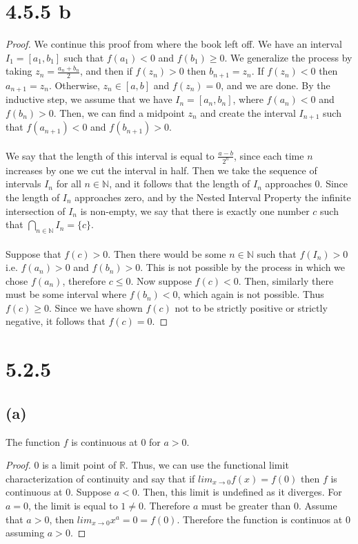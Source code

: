 \documentclass{article}
\begin{document}
\section*{4.5.5 b}
\begin{proof}
We continue this proof from where the book left off. We have an interval $I_1 = [a_1, b_1]$ such that $f(a_1) < 0$ and $f(b_1) \geqslant 0$. We generalize the process by taking $z_n = \frac{a_n + b_n}{2}$, and then if $f(z_n) > 0$ then $b_{n+1} = z_n$. If $f(z_n) < 0$ then $a_{n+1} = z_n$. Otherwise, $z_n \in [a,b]$ and $f(z_n) = 0$, and we are done. By the inductive step, we assume that we have $I_n = [a_n, b_n]$, where $f(a_n) < 0$ and $f(b_n) > 0$. Then, we can find a midpoint $z_n$ and create the interval $I_{n+1}$ such that $f(a_{n+1}) < 0$ and $f(b_{n+1}) > 0$. \\\\
We say that the length of this interval is equal to $\frac{a-b}{2^n}$, since each time $n$ increases by one we cut the interval in half. Then we take the sequence of intervals $I_n$ for all $n \in \mathbb{N}$, and it follows that the length of $I_n$ approaches 0. Since the length of $I_n$ approaches zero, and by the Nested Interval Property the infinite intersection of $I_n$ is non-empty, we say that there is exactly one number $c$ such that $\bigcap_{n \in \mathbb{N}}I_n = \{c\}$. \\\\
Suppose that $f(c) > 0$. Then there would be some $n \in \mathbb{N}$ such that $f(I_n) > 0$ i.e. $f(a_n) > 0$ and $f(b_n) > 0$. This is not possible by the process in which we chose $f(a_n)$, therefore $c \leqslant 0$. Now suppose $f(c) < 0$. Then, similarly there must be some interval where $f(b_n) < 0$, which again is not possible. Thus $f(c )\geqslant 0$. Since we have shown $f(c)$ not to be strictly positive or strictly negative, it follows that $f(c) = 0$.
\end{proof}

\section*{5.2.5}
\subsection*{(a)}
The function $f$ is continuous at 0 for $a > 0$.
\begin{proof}
0 is a limit point of $\mathbb{R}$. Thus, we can use the functional limit characterization of continuity and say that if $lim_{x \rightarrow 0}f(x) = f(0)$ then $f$ is continuous at 0. Suppose $a < 0$. Then, this limit is undefined as it diverges. For $a=0$, the limit is equal to $1 \neq 0$. Therefore $a$ must be greater than 0. Assume that $a > 0$, then $lim_{x \rightarrow 0}x^a = 0 = f(0)$. Therefore the function is continuos at $0$ assuming $a > 0$.
\end{proof}
\end{document}
